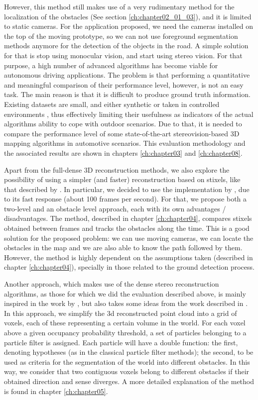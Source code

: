 However, this method still makes use of a very rudimentary method for the localization of the obstacles (See section \ref{ch:chapter02_01_03}), and it is limited to static cameras. For the application proposed, we need the cameras installed on the top of the moving prototype, so we can not use foreground segmentation methods anymore for the detection of the objects in the road. A simple solution for that is stop using monocular vision, and start using stereo vision. For that purpose, a high number of advanced algorithms has become viable for autonomous driving applications. The problem is that performing a quantitative and meaningful comparison of their performance level, however, is not an easy task. The main reason is that it is difficult to produce ground truth information. Existing datasets are small, and either synthetic or taken in controlled environments \citep{Scharstein2002}, thus effectively limiting their usefulness as indicators of the actual algorithms ability to cope with outdoor scenarios. Due to that, it is needed to compare the performance level of some state-of-the-art stereovision-based 3D mapping algorithms in automotive scenarios. This evaluation methodology and the associated results are shown in chapters \ref{ch:chapter03} and \ref{ch:chapter08}.

Apart from the full-dense 3D reconstruction methods, we also explore the possibility of using a simpler (and faster) reconstruction based on stixels, like that described by \cite{badino2009stixel}. In particular, we decided to use the implementation by \cite{benenson2012pedestrian}, due to its fast response (about 100 frames per second). For that, we propose both a two-level and an obstacle level approach, each with its own advantages / disadvantages. The method, described in chapter \ref{ch:chapter04}, compares stixels obtained between frames and tracks the obstacles along the time. This is a good solution for the proposed problem: we can use moving cameras, we can locate the obstacles in the map and we are also able to know the path followed by them. However, the method is highly dependent on the assumptions taken (described in chapter \ref{ch:chapter04}), specially in those related to the ground detection process.

Another approach, which makes use of the dense stereo reconstruction algorithms, as those for which we did the evaluation described above, is mainly inspired in the work by \cite{danescu2012particle}, but also takes some ideas from the work described in \cite{broggi2013}. In this approach, we simplify the 3d reconstructed point cloud into a grid of voxels, each of these representing a certain volume in the world. For each voxel above a given occupancy probability threshold, a set of particles belonging to a particle filter is assigned. Each particle will have a double function: the first, denoting hypotheses (as in the classical particle filter methods); the second, to be used as criteria for the segmentation of the world into different obstacles. In this way, we consider that two contiguous voxels belong to different obstacles if their obtained direction and sense diverges. A more detailed explanation of the method is found in chapter \ref{ch:chapter05}.

